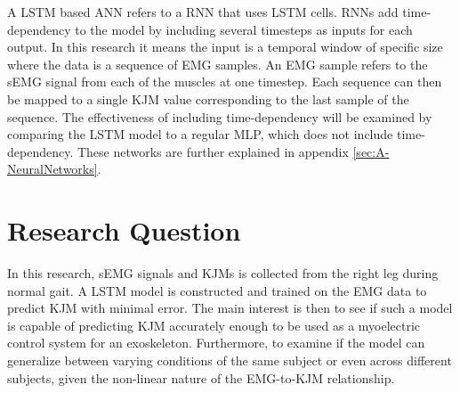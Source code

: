 \documentclass[../main.tex]{subfiles}
\begin{document}
A \ac{LSTM} based \ac{ANN} refers to a \ac{RNN} that uses \ac{LSTM} cells.
\acp{RNN} add time-dependency to the model by including several timesteps as inputs for each output.
In this research it means the input is a temporal window of specific size where the data is a sequence of \ac{EMG} samples.
An \ac{EMG} sample refers to the \ac{sEMG} signal from each of the muscles at one timestep.
Each sequence can then be mapped to a single \ac{KJM} value corresponding to the last sample of the sequence.
The effectiveness of including time-dependency will be examined by comparing the \ac{LSTM} model to a regular \ac{MLP}, which does not include time-dependency.
These networks are further explained in appendix \ref{sec:A-NeuralNetworks}.

\section{Research Question}
In this research, \ac{sEMG} signals and \acp{KJM} is collected from the right leg during normal gait.
A \ac{LSTM} model is constructed and trained on the \ac{EMG} data to predict \ac{KJM} with minimal error.
The main interest is then to see if such a model is capable of predicting \ac{KJM} accurately enough to be used as a myoelectric control system for an exoskeleton.
Furthermore, to examine if the model can generalize between varying conditions of the same subject or even across different subjects, given the non-linear nature of the \ac{EMG}-to-\ac{KJM} relationship. 
\end{document}
